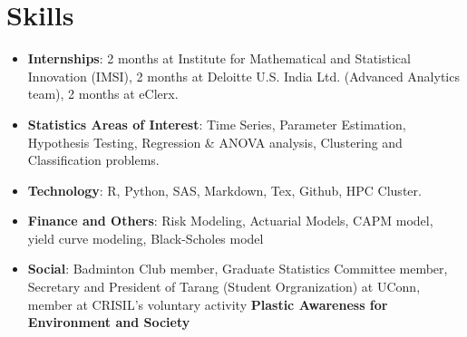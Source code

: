 \documentclass[letterpaper,11pt]{article}
\newcommand{\resumeItem}[2]{
  \item\small{
    \textbf{#1}{: #2 \vspace{-2pt}}
  }
}
\newcommand{\resumeSubItem}[2]{\resumeItem{#1}{#2}\vspace{-4pt}}
\newcommand{\resumeSubHeadingListStart}{\begin{itemize}[leftmargin=*]}
\newcommand{\resumeSubHeadingListEnd}{\end{itemize}}
\begin{document}
\section{Skills}
  \resumeSubHeadingListStart
    \resumeSubItem{Internships}
      {2 months at Institute for Mathematical and Statistical Innovation (IMSI), 2 months at Deloitte U.S. India Ltd.  (Advanced Analytics team),  2 months at eClerx.}
    \resumeSubItem{Statistics Areas of Interest}
      {Time Series, Parameter Estimation, Hypothesis Testing, Regression \& ANOVA analysis, Clustering and Classification problems.}
    \resumeSubItem{Technology}
      {R, Python, SAS, Markdown, Tex, Github, HPC Cluster.}
    \resumeSubItem{Finance and Others}
      {Risk Modeling, Actuarial Models, CAPM model, yield curve modeling, Black-Scholes model}
    \resumeSubItem{Social}
      {Badminton Club member, Graduate Statistics Committee member,  Secretary and President of Tarang (Student Orgranization) at UConn,  member at CRISIL's voluntary activity {\bf Plastic Awareness for Environment and Society}}      
  \resumeSubHeadingListEnd

\end{document}
